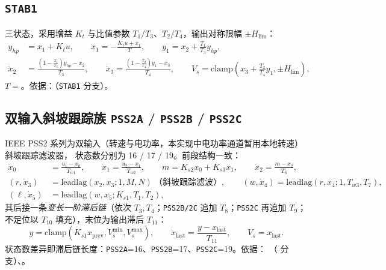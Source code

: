 \subsection{\texttt{STAB1}}
三状态，采用增益 $K_t$ 与比值参数 $T_1/T_3$、$T_2/T_4$，输出对称限幅 $\pm H_{\mathrm{lim}}$：
\begin{align}
 y_{hp}&=x_1+K_t u,\qquad \dot x_1=-\frac{K_t u+x_1}{T},\qquad
 y_1=x_2+\frac{T_1}{T_3}y_{hp},\\
 \dot x_2&=\frac{\left(1-\tfrac{T_1}{T_3}\right)y_{hp}-x_2}{T_3},\qquad
 \dot x_3=\frac{\left(1-\tfrac{T_2}{T_4}\right)y_1-x_3}{T_4},\qquad
 V_s=\mathrm{clamp}\!\left(x_3+\frac{T_2}{T_4}y_1,\pm H_{\mathrm{lim}}\right),
\end{align}
$T=$。依据：（\texttt{STAB1} 分支）。

\subsection{双输入斜坡跟踪族 \texttt{PSS2A} / \texttt{PSS2B} / \texttt{PSS2C}}
\label{sec:dynamics-pss2}
IEEE PSS2 系列为双输入（转速与电功率，本实现中电功率通道暂用本地转速）斜坡跟踪滤波器，
状态数分别为 16 / 17 / 19。前段结构一致：
\begin{align}
 \dot x_0&=\frac{u_1-x_0}{T_{w1}},\qquad \dot x_1=\frac{u_2-x_1}{T_{w2}},\qquad
 m=K_{s2}x_0+K_{s3}x_1,\qquad \dot x_2=\frac{m-x_2}{T_6},\\
 (r,\dot x_3)&=\mathrm{leadlag}(x_2,x_3;1,M,N)\ \text{（斜坡跟踪滤波）},\qquad
 (w,\dot x_4)=\mathrm{leadlag}(r,x_4;1,T_{w3},T_7),\\
 (\ell,\dot x_5)&=\mathrm{leadlag}(w,x_5;K_{s1},T_1,T_2),
\end{align}
其后接一条\emph{变长一阶滞后链}（依次 $T_3,T_4$；\texttt{PSS2B/2C} 追加 $T_8$；\texttt{PSS2C} 再追加 $T_9$；
不足位以 $T_{10}$ 填充），末位为输出滞后 $T_{11}$：
\begin{equation}
 y=\mathrm{clamp}(K_{s1}x_{\mathrm{prev}},V_s^{\min},V_s^{\max}),\qquad
 \dot x_{\mathrm{last}}=\frac{y-x_{\mathrm{last}}}{T_{11}},\qquad V_s=x_{\mathrm{last}}.
\end{equation}
状态数差异即滞后链长度：\texttt{PSS2A}=16、\texttt{PSS2B}=17、\texttt{PSS2C}=19。依据：
（ 分支）、。

